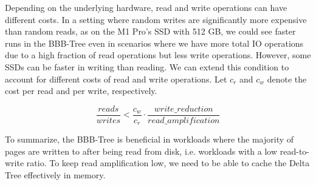 Depending on the underlying hardware, read and write operations can have different costs.
In a setting where random writes are significantly more expensive than random reads, as on the M1 Pro's SSD with 512 GB, we could see faster runs in the BBB-Tree even in scenarios where we have more total \ac{IO} operations due to a high fraction of read operations but less write operations.
However, some SSDs can be faster in writing than reading.
We can extend this condition to account for different costs of read and write operations.
Let $c_r$ and $c_w$ denote the cost per read and per write, respectively.  


\begin{equation}
\frac{reads}{writes} < \frac{c_w}{c_r} \cdot
\frac{write\_reduction}{read\_amplification}
\label{eq:ratio_condition_costs}
\end{equation}

To summarize, the BBB-Tree is beneficial in workloads where the majority of pages are written to after being read from disk, i.e. workloads with a low read-to-write ratio.
To keep read amplification low, we need to be able to cache the Delta Tree effectively in memory.





